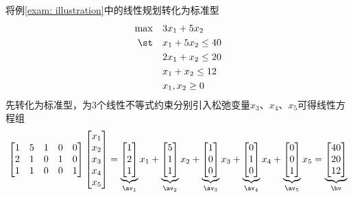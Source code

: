 \documentclass{ctexart}
\begin{document}
\begin{example} \label{exam: simplex}
    将例\ref{exam: illustration}中的线性规划转化为标准型
    \begin{align*}
        \max \quad & 3 x_1 + 5 x_2      \\
        \st  \quad & x_1 + 5 x_2 \le 40 \\
                   & 2 x_1 + x_2 \le 20 \\
                   & x_1 + x_2 \le 12   \\
                   & x_1,x_2 \ge 0
    \end{align*}
    先转化为标准型，为$3$个线性不等式约束分别引入松弛变量$x_3$、$x_4$、$x_5$可得线性方程组
    \begin{align*}
        \begin{bmatrix}
            1 & 5 & 1 & 0 & 0 \\
            2 & 1 & 0 & 1 & 0 \\
            1 & 1 & 0 & 0 & 1
        \end{bmatrix}
        \begin{bmatrix}
            x_1 \\ x_2 \\ x_3 \\ x_4 \\ x_5
        \end{bmatrix} =
        \underbrace{\begin{bmatrix}
                            1 \\ 2 \\ 1
                        \end{bmatrix}}_{\av_1} x_1 +
        \underbrace{\begin{bmatrix}
                            5 \\ 1 \\ 1
                        \end{bmatrix}}_{\av_2} x_2 +
        \underbrace{\begin{bmatrix}
                            1 \\ 0 \\ 0
                        \end{bmatrix}}_{\av_3} x_3 +
        \underbrace{\begin{bmatrix}
                            0 \\ 1 \\ 0
                        \end{bmatrix}}_{\av_4} x_4 +
        \underbrace{\begin{bmatrix}
                            0 \\ 0 \\ 1
                        \end{bmatrix}}_{\av_5} x_5 =
        \underbrace{\begin{bmatrix}
                            40 \\ 20 \\ 12
                        \end{bmatrix}}_{\bv}
    \end{align*}
\end{example}
\end{document}
